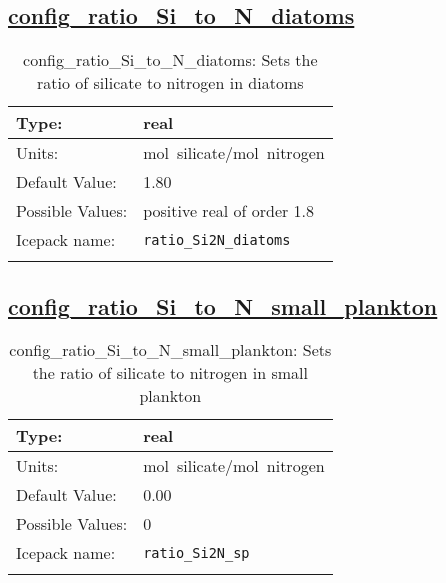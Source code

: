 \subsection[config\_ratio\_Si\_to\_N\_diatoms]{\hyperref[sec:nm_tab_biogeochemistry]{config\_ratio\_Si\_to\_N\_diatoms}}
\label{subsec:nm_sec_config_ratio_Si_to_N_diatoms}
\begin{center}
\begin{longtable}{| p{2.0in} || p{4.0in} |}
    \hline
    Type: & real \\
    \hline
    Units: & \si{mol.silicate/mol.nitrogen} \\
    \hline
    Default Value: & 1.80 \\
    \hline
    Possible Values: & positive real of order 1.8 \\
    \hline
    \hline
    Icepack name: & \verb+ratio_Si2N_diatoms+ \\
    \caption{config\_ratio\_Si\_to\_N\_diatoms: Sets the ratio of silicate to nitrogen in diatoms}
\end{longtable}
\end{center}
\subsection[config\_ratio\_Si\_to\_N\_small\_plankton]{\hyperref[sec:nm_tab_biogeochemistry]{config\_ratio\_Si\_to\_N\_small\_plankton}}
\label{subsec:nm_sec_config_ratio_Si_to_N_small_plankton}
\begin{center}
\begin{longtable}{| p{2.0in} || p{4.0in} |}
    \hline
    Type: & real \\
    \hline
    Units: & \si{mol.silicate/mol.nitrogen} \\
    \hline
    Default Value: & 0.00 \\
    \hline
    Possible Values: & 0 \\
    \hline
    \hline
    Icepack name: & \verb+ratio_Si2N_sp+ \\
    \caption{config\_ratio\_Si\_to\_N\_small\_plankton: Sets the ratio of silicate to nitrogen in small plankton}
\end{longtable}
\end{center}
